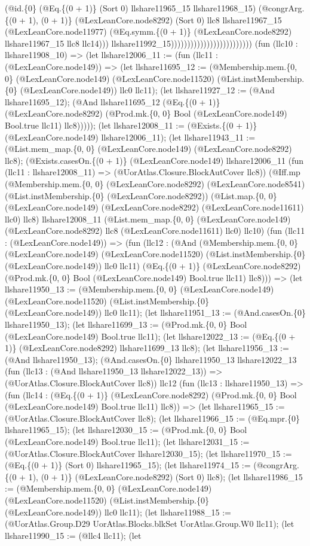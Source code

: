 \documentclass[11pt]{article}
\begin{document}
(@id.\{0\} (@Eq.\{(0 + 1)\} (Sort 0) llshare11965\_15 llshare11968\_15) (@congrArg.\{(0 + 1), (0 + 1)\} (@LexLeanCore.node8292) (Sort 0) llc8 llshare11967\_15 (@LexLeanCore.node11977) (@Eq.symm.\{(0 + 1)\} (@LexLeanCore.node8292) llshare11967\_15 llc8 llc14))) llshare11992\_15))))))))))))))))))))))))) (fun (llc10 : llshare11908\_10) => (let llshare12006\_11 := (fun (llc11 : (@LexLeanCore.node149)) => (let llshare11695\_12 := (@Membership.mem.\{0, 0\} (@LexLeanCore.node149) (@LexLeanCore.node11520) (@List.instMembership.\{0\} (@LexLeanCore.node149)) llc0 llc11); (let llshare11927\_12 := (@And llshare11695\_12); (@And llshare11695\_12 (@Eq.\{(0 + 1)\} (@LexLeanCore.node8292) (@Prod.mk.\{0, 0\} Bool (@LexLeanCore.node149) Bool.true llc11) llc8))))); (let llshare12008\_11 := (@Exists.\{(0 + 1)\} (@LexLeanCore.node149) llshare12006\_11); (let llshare11943\_11 := (@List.mem\_map.\{0, 0\} (@LexLeanCore.node149) (@LexLeanCore.node8292) llc8); (@Exists.casesOn.\{(0 + 1)\} (@LexLeanCore.node149) llshare12006\_11 (fun (llc11 : llshare12008\_11) => (@UorAtlas.Closure.BlockAutCover llc8)) (@Iff.mp (@Membership.mem.\{0, 0\} (@LexLeanCore.node8292) (@LexLeanCore.node8541) (@List.instMembership.\{0\} (@LexLeanCore.node8292)) (@List.map.\{0, 0\} (@LexLeanCore.node149) (@LexLeanCore.node8292) (@LexLeanCore.node11611) llc0) llc8) llshare12008\_11 (@List.mem\_map.\{0, 0\} (@LexLeanCore.node149) (@LexLeanCore.node8292) llc8 (@LexLeanCore.node11611) llc0) llc10) (fun (llc11 : (@LexLeanCore.node149)) => (fun (llc12 : (@And (@Membership.mem.\{0, 0\} (@LexLeanCore.node149) (@LexLeanCore.node11520) (@List.instMembership.\{0\} (@LexLeanCore.node149)) llc0 llc11) (@Eq.\{(0 + 1)\} (@LexLeanCore.node8292) (@Prod.mk.\{0, 0\} Bool (@LexLeanCore.node149) Bool.true llc11) llc8))) => (let llshare11950\_13 := (@Membership.mem.\{0, 0\} (@LexLeanCore.node149) (@LexLeanCore.node11520) (@List.instMembership.\{0\} (@LexLeanCore.node149)) llc0 llc11); (let llshare11951\_13 := (@And.casesOn.\{0\} llshare11950\_13); (let llshare11699\_13 := (@Prod.mk.\{0, 0\} Bool (@LexLeanCore.node149) Bool.true llc11); (let llshare12022\_13 := (@Eq.\{(0 + 1)\} (@LexLeanCore.node8292) llshare11699\_13 llc8); (let llshare11956\_13 := (@And llshare11950\_13); (@And.casesOn.\{0\} llshare11950\_13 llshare12022\_13 (fun (llc13 : (@And llshare11950\_13 llshare12022\_13)) => (@UorAtlas.Closure.BlockAutCover llc8)) llc12 (fun (llc13 : llshare11950\_13) => (fun (llc14 : (@Eq.\{(0 + 1)\} (@LexLeanCore.node8292) (@Prod.mk.\{0, 0\} Bool (@LexLeanCore.node149) Bool.true llc11) llc8)) => (let llshare11965\_15 := (@UorAtlas.Closure.BlockAutCover llc8); (let llshare11966\_15 := (@Eq.mpr.\{0\} llshare11965\_15); (let llshare12030\_15 := (@Prod.mk.\{0, 0\} Bool (@LexLeanCore.node149) Bool.true llc11); (let llshare12031\_15 := (@UorAtlas.Closure.BlockAutCover llshare12030\_15); (let llshare11970\_15 := (@Eq.\{(0 + 1)\} (Sort 0) llshare11965\_15); (let llshare11974\_15 := (@congrArg.\{(0 + 1), (0 + 1)\} (@LexLeanCore.node8292) (Sort 0) llc8); (let llshare11986\_15 := (@Membership.mem.\{0, 0\} (@LexLeanCore.node149) (@LexLeanCore.node11520) (@List.instMembership.\{0\} (@LexLeanCore.node149)) llc0 llc11); (let llshare11988\_15 := (@UorAtlas.Group.D29 UorAtlas.Blocks.blkSet UorAtlas.Group.W0 llc11); (let llshare11990\_15 := (@llc4 llc11); (let 
\end{document}
